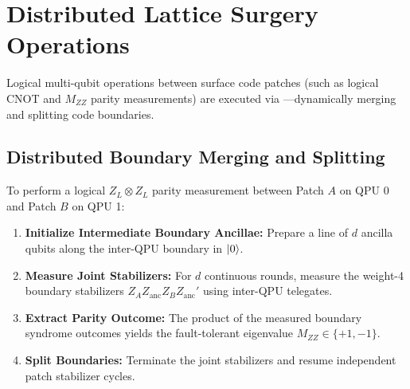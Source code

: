 \section{Distributed Lattice Surgery Operations}
\label{sec:distributed_lattice_surgery}

Logical multi-qubit operations between surface code patches (such as logical CNOT and $M_{ZZ}$ parity measurements) are executed via ---dynamically merging and splitting code boundaries.

\subsection{Distributed Boundary Merging and Splitting}
To perform a logical $Z_L \otimes Z_L$ parity measurement between Patch $A$ on QPU 0 and Patch $B$ on QPU 1:
\begin{enumerate}
    \item \textbf{Initialize Intermediate Boundary Ancillae:} Prepare a line of $d$ ancilla qubits along the inter-QPU boundary in $\ket{0}$.
    \item \textbf{Measure Joint Stabilizers:} For $d$ continuous rounds, measure the weight-4 boundary stabilizers $Z_A Z_{\text{anc}} Z_B Z_{\text{anc}}'$ using inter-QPU telegates.
    \item \textbf{Extract Parity Outcome:} The product of the measured boundary syndrome outcomes yields the fault-tolerant eigenvalue $M_{ZZ} \in \{+1, -1\}$.
    \item \textbf{Split Boundaries:} Terminate the joint stabilizers and resume independent patch stabilizer cycles.
\end{enumerate}

